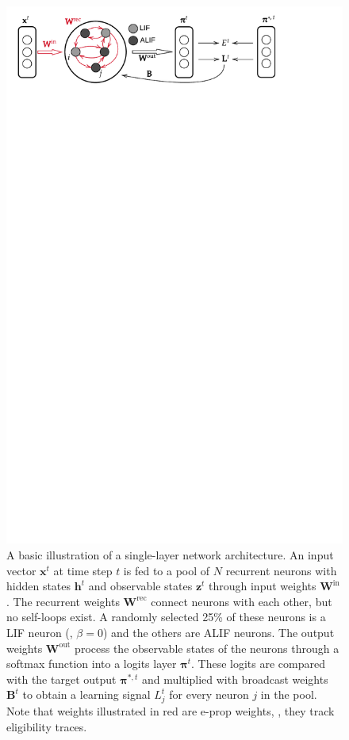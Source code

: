         \begin{figure}[!ht]
            \myfloatalign
            \includegraphics[trim=0 25cm 0 0, clip, width=\linewidth]{gfx/Singlelayer}\caption[Single-layer architecture illustration]{A basic illustration of a single-layer network architecture.
            An input vector $\mathbf{x}^t$ at time step $t$ is fed to a pool of $N$ recurrent neurons with hidden states $\mathbf{h}^t$ and observable states $\mathbf{z}^t$ through input weights $\mathbf{W}^\text{in}$. The recurrent weights $\mathbf{W}^\text{rec}$ connect neurons with each other, but no self-loops exist. A randomly selected 25\% of these neurons is a LIF neuron (\ie, $\beta = 0$) and the others are ALIF neurons. The output weights $\mathbf{W}^\text{out}$ process the observable states of the neurons through a softmax function into a logits layer $\mathbf{\pi}^t$. These logits are compared with the target output $\mathbf{\pi}^{*, t}$ and multiplied with broadcast weights $\mathbf{B}^t$ to obtain a learning signal $L_j^t$ for every neuron $j$ in the pool. Note that weights illustrated in red are e-prop weights, \ie, they track eligibility traces.}
            \label{fig:topology-sl}
          \end{figure}

